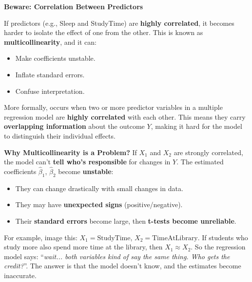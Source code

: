 \highspace
\begin{flushleft}
    \textcolor{Red2}{ \textbf{Beware: Correlation Between Predictors}}
\end{flushleft}
If predictors (e.g., Sleep and StudyTime) are \textbf{highly correlated}, it becomes harder to isolate the effect of one from the other. This is known as \textbf{multicollinearity}, and it can:
\begin{itemize}[label=\textcolor{Red2}{}]
    \item Make coefficients unstable.
    \item Inflate standard errors.
    \item Confuse interpretation.
\end{itemize}
More formally,  occurs when two or more predictor variables in a multiple regression model are \textbf{highly correlated} with each other. This means they carry \textbf{overlapping information} about the outcome $Y$, making it hard for the model to distinguish their individual effects.

\highspace
\textcolor{Red2}{ \textbf{Why Multicollinearity is a Problem?}} If $X_1$ and $X_2$ are strongly correlated, the model can't \textbf{tell who's responsible} for changes in $Y$. The estimated coefficients $\hat{\beta}_1$, $\hat{\beta}_2$ become \textbf{unstable}:
\begin{itemize}
    \item They can change drastically with small changes in data.
    \item They may have \textbf{unexpected signs} (positive/negative).
    \item Their \textbf{standard errors} become large, then \textbf{t-tests become unreliable}.
\end{itemize}
For example, image this: $X_1 = \text{StudyTime}$, $X_2 = \text{TimeAtLibrary}$. If students who study more also spend more time at the library, then $X_1 \approx X_2$. So the regression model says: ``\emph{wait... both variables kind of say the same thing. Who gets the credit?}''. The answer is that the model doesn't know, and the estimates become inaccurate.

